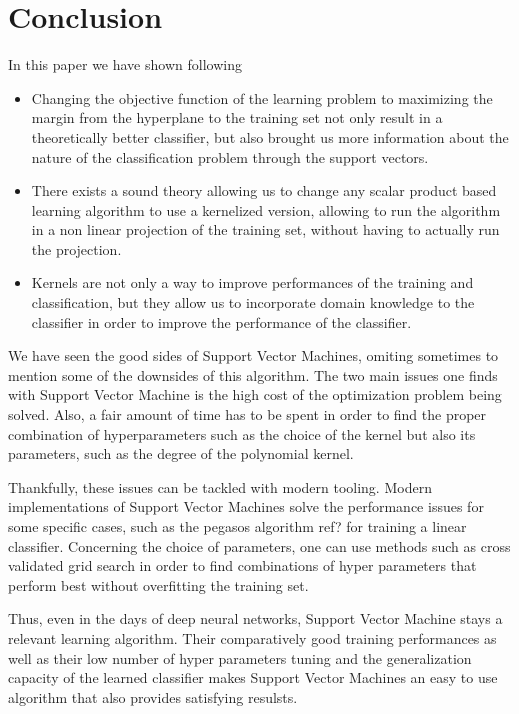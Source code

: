 \section{Conclusion}

In this paper we have shown following

\begin{itemize}
\item Changing the objective function of the learning problem to maximizing the margin from the hyperplane to the training set not only result in a theoretically better classifier, but also brought us more information about the nature of the classification problem through the support vectors.
\item There exists a sound theory allowing us to change any scalar product based learning algorithm to use a kernelized version, allowing to run the algorithm in a non linear projection of the training set, without having to actually run the projection.
\item Kernels are not only a way to improve performances of the training and classification, but they allow us to incorporate domain knowledge to the classifier in order to improve the performance of the classifier.
\end{itemize}

We have seen the good sides of Support Vector Machines, omiting sometimes to mention some of the downsides of this algorithm. The two main issues one finds with Support Vector Machine is the high cost of the optimization problem being solved. Also, a fair amount of time has to be spent in order to find the proper combination of hyperparameters such as the choice of the kernel but also its parameters, such as the degree of the polynomial kernel.

Thankfully, these issues can be tackled with modern tooling. Modern implementations of Support Vector Machines solve the performance issues for some specific cases, such as the pegasos algorithm \textcolor[rgb]{1,0,0}{ref?} for training a linear classifier. Concerning the choice of parameters, one can use methods such as cross validated grid search in order to find combinations of hyper parameters that perform best without overfitting the training set.

Thus, even in the days of deep neural networks, Support Vector Machine stays a relevant learning algorithm. Their comparatively good training performances as well as their low number of hyper parameters tuning and the generalization capacity of the learned classifier makes Support Vector Machines an easy to use algorithm that also provides satisfying resulsts.

